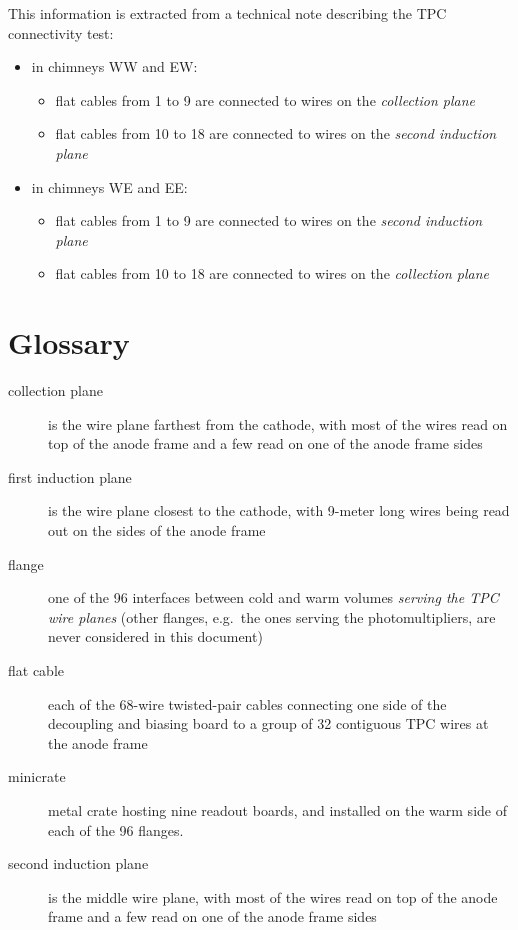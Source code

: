 \documentclass{article}
\newcommand{\eg}{e.g.\ }
\begin{document}
This information is extracted from a technical note describing the TPC connectivity test:
\begin{itemize}
  \item in chimneys WW and EW:
    \begin{itemize}
      \item flat cables from 1 to 9 are connected to wires on the \emph{collection plane}
      \item flat cables from 10 to 18 are connected to wires on the \emph{second induction plane}
    \end{itemize}
  \item in chimneys WE and EE:
    \begin{itemize}
      \item flat cables from 1 to 9 are connected to wires on the \emph{second induction plane}
      \item flat cables from 10 to 18 are connected to wires on the \emph{collection plane}
    \end{itemize}
\end{itemize}



\section{Glossary}
\label{sec:glossary}

\begin{description}
  \item[collection plane] is the wire plane farthest from the cathode,
    with most of the wires read on top of the anode frame and a few read on one
    of the anode frame sides
  \item[first induction plane] is the wire plane closest to the cathode,
    with 9-meter long wires being read out on the sides of the anode frame
  \item[flange] one of the 96 interfaces between cold and warm volumes
    \emph{serving the TPC wire planes}
    (other flanges, \eg the ones serving the photomultipliers, are never
    considered in this document)
  \item[flat cable] each of the 68-wire twisted-pair cables connecting one side
    of the decoupling and biasing board to a group of 32 contiguous TPC wires
    at the anode frame
  \item[minicrate] metal crate hosting nine readout boards,
    and installed on the warm side of each of the 96 flanges.
  \item[second induction plane] is the middle wire plane,
    with most of the wires read on top of the anode frame and a few read on one
    of the anode frame sides
\end{description}





\end{document}
